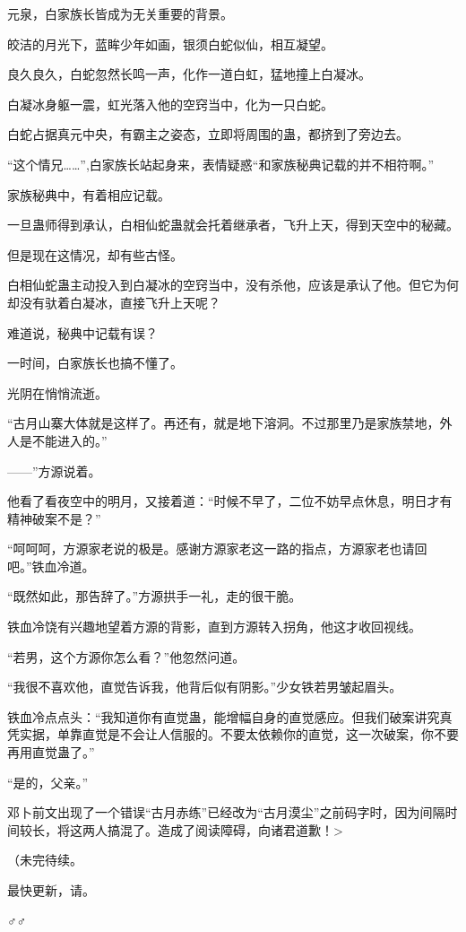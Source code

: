 \begin{this_body}
元泉，白家族长皆成为无关重要的背景。

皎洁的月光下，蓝眸少年如画，银须白蛇似仙，相互凝望。

良久良久，白蛇忽然长鸣一声，化作一道白虹，猛地撞上白凝冰。

白凝冰身躯一震，虹光落入他的空窍当中，化为一只白蛇。

白蛇占据真元中央，有霸主之姿态，立即将周围的蛊，都挤到了旁边去。

“这个情兄……”,白家族长站起身来，表情疑惑“和家族秘典记载的并不相符啊。”

家族秘典中，有着相应记载。

一旦蛊师得到承认，白相仙蛇蛊就会托着继承者，飞升上天，得到天空中的秘藏。

但是现在这情况，却有些古怪。

白相仙蛇蛊主动投入到白凝冰的空窍当中，没有杀他，应该是承认了他。但它为何却没有驮着白凝冰，直接飞升上天呢？

难道说，秘典中记载有误？

一时间，白家族长也搞不懂了。

光阴在悄悄流逝。

“古月山寨大体就是这样了。再还有，就是地下溶洞。不过那里乃是家族禁地，外人是不能进入的。”

——”方源说着。

他看了看夜空中的明月，又接着道：“时候不早了，二位不妨早点休息，明日才有精神破案不是？”

“呵呵呵，方源家老说的极是。感谢方源家老这一路的指点，方源家老也请回吧。”铁血冷道。

“既然如此，那告辞了。”方源拱手一礼，走的很干脆。

铁血冷饶有兴趣地望着方源的背影，直到方源转入拐角，他这才收回视线。

“若男，这个方源你怎么看？”他忽然问道。

“我很不喜欢他，直觉告诉我，他背后似有阴影。”少女铁若男皱起眉头。

铁血冷点点头：“我知道你有直觉蛊，能增幅自身的直觉感应。但我们破案讲究真凭实据，单靠直觉是不会让人信服的。不要太依赖你的直觉，这一次破案，你不要再用直觉蛊了。”

“是的，父亲。”

邓卜前文出现了一个错误“古月赤练”已经改为“古月漠尘”之前码字时，因为间隔时间较长，将这两人搞混了。造成了阅读障碍，向诸君道歉！>

（未完待续。

最快更新，请。

♂♂

\end{this_body}

